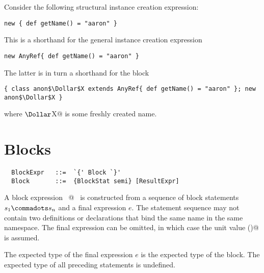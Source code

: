 \example Consider the following structural instance creation
expression:
\begin{lstlisting}
new { def getName() = "aaron" }
\end{lstlisting}
This is a shorthand for the general instance creation expression
\begin{lstlisting}
new AnyRef{ def getName() = "aaron" }
\end{lstlisting}
The latter is in turn a shorthand for the block
\begin{lstlisting}
{ class anon$\Dollar$X extends AnyRef{ def getName() = "aaron" }; new anon$\Dollar$X }
\end{lstlisting}
where \lstinline@anon$\Dollar$X@ is some freshly created name.

\section{Blocks}
\label{sec:blocks}

\syntax\begin{lstlisting}
  BlockExpr   ::=  `{' Block `}'
  Block       ::=  {BlockStat semi} [ResultExpr]
\end{lstlisting}

A block expression ~@~ is
constructed from a sequence of block statements $s_1 \commadots s_n$
and a final expression $e$.  The statement sequence may not contain
two definitions or declarations that bind the same name in the same
namespace.  The final expression can be omitted, in which
case the unit value \lstinline@()@ is assumed.


The expected type of the final expression $e$ is the expected
type of the block. The expected type of all preceding statements is
undefined.

